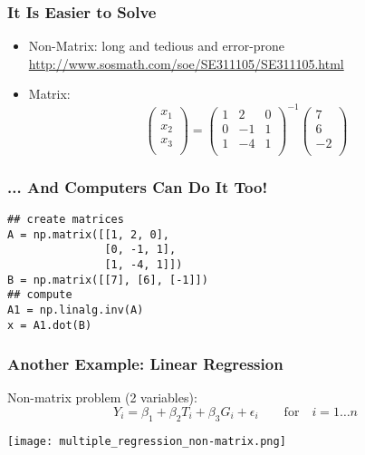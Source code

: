 \documentclass[mathserif, xcolor=table, svgnames]{beamer}
\begin{document}
\begin{frame}
\frametitle{It Is Easier to Solve}
\begin{itemize}
\item Non-Matrix: long and tedious and error-prone
  \url{http://www.sosmath.com/soe/SE311105/SE311105.html}
\item Matrix:
  \begin{equation*}
    \begin{pmatrix}
      x_{1}\\
      x_{2}\\
      x_{3}\\
    \end{pmatrix}
    =
    \begin{pmatrix}
      1 & 2 & 0\\
      0 & -1 & 1\\
      1 & -4 & 1\\
    \end{pmatrix}
    ^{-1}
    \begin{pmatrix}
      7\\
      6\\
      -2\\
    \end{pmatrix}
  \end{equation*}
\end{itemize}
\end{frame}


\begin{frame}[fragile]
\frametitle{... And Computers Can Do It Too!}
\begin{lstlisting}[frame=trBL]
## create matrices
A = np.matrix([[1, 2, 0], 
               [0, -1, 1], 
               [1, -4, 1]])
B = np.matrix([[7], [6], [-1]])
## compute
A1 = np.linalg.inv(A)
x = A1.dot(B)
\end{lstlisting}
\end{frame}

\begin{frame}
  \frametitle{Another Example: Linear Regression}
  Non-matrix problem (2 variables):
  \begin{equation*}
    Y_{i} = \beta_{1} + \beta_{2} T_{i} + \beta_{3} G_{i} +
    \epsilon_{i}
    \qquad
    \text{for}\quad
    i = 1\dots n
  \end{equation*}
\end{frame}

\begin{frame}
  \begin{center}
    \texttt{[image: multiple\_regression\_non-matrix.png]}
  \end{center}
\end{frame}
\end{document}
